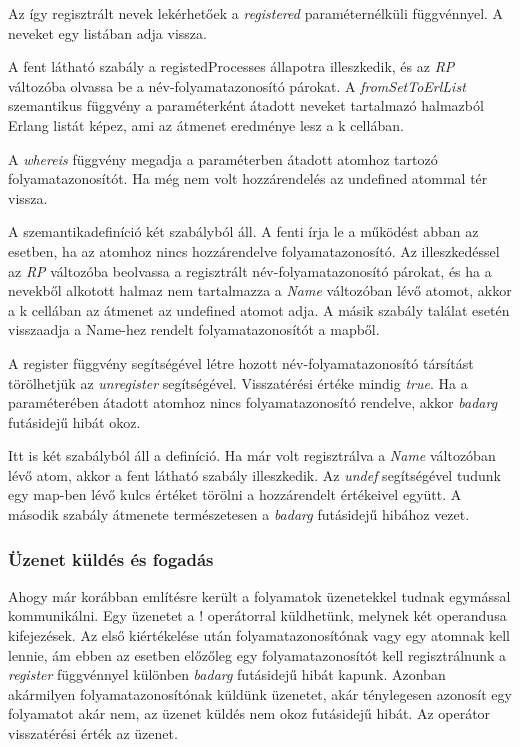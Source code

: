 Az így regisztrált nevek lekérhetőek a \textit{registered} paraméternélküli függvénnyel. A neveket egy listában adja vissza.



A fent látható szabály a registedProcesses állapotra illeszkedik, és az \textit{RP} változóba olvassa be a név-folyamatazonosító párokat. A \textit{fromSetToErlList} szemantikus függvény a paraméterként átadott neveket tartalmazó halmazból Erlang listát képez, ami az átmenet eredménye lesz a k cellában.

A \textit{whereis} függvény megadja a paraméterben átadott atomhoz tartozó folyamatazonosítót. Ha még nem volt hozzárendelés az undefined atommal tér vissza.



A szemantikadefiníció két szabályból áll. A fenti írja le a működést abban az esetben, ha az atomhoz nincs hozzárendelve folyamatazonosító. Az illeszkedéssel az \textit{RP} változóba beolvassa a regisztrált név-folyamatazonosító párokat, és ha a nevekből alkotott halmaz nem tartalmazza a \textit{Name} változóban lévő atomot, akkor a k cellában az átmenet az undefined atomot adja. A másik szabály találat esetén visszaadja a Name-hez rendelt folyamatazonosítót a mapből.

A register függvény segítségével létre hozott név-folyamatazonosító társítást törölhetjük az \textit{unregister} segítségével. Visszatérési értéke mindig \textit{true}. Ha a paraméterében átadott atomhoz nincs folyamatazonosító rendelve, akkor \textit{badarg} futásidejű hibát okoz.



Itt is két szabályból áll a definíció. Ha már volt regisztrálva a \textit{Name} változóban lévő atom, akkor a fent látható szabály illeszkedik. Az \textit{undef} segítségével tudunk egy map-ben lévő kulcs értéket törölni a hozzárendelt értékeivel együtt. A második szabály átmenete természetesen a \textit{badarg} futásidejű hibához vezet.

\subsubsection{Üzenet küldés és fogadás}

Ahogy már korábban említésre került a folyamatok üzenetekkel tudnak egymással kommunikálni. Egy üzenetet a ! operátorral küldhetünk, melynek két operandusa kifejezések. Az első kiértékelése után folyamatazonosítónak vagy egy atomnak kell lennie, ám ebben az esetben előzőleg egy folyamatazonosítót kell regisztrálnunk a \textit{register} függvénnyel különben \textit{badarg} futásidejű hibát kapunk. Azonban akármilyen folyamatazonosítónak küldünk üzenetet, akár ténylegesen azonosít egy folyamatot akár nem, az üzenet küldés nem okoz futásidejű hibát. Az operátor visszatérési érték az üzenet.

